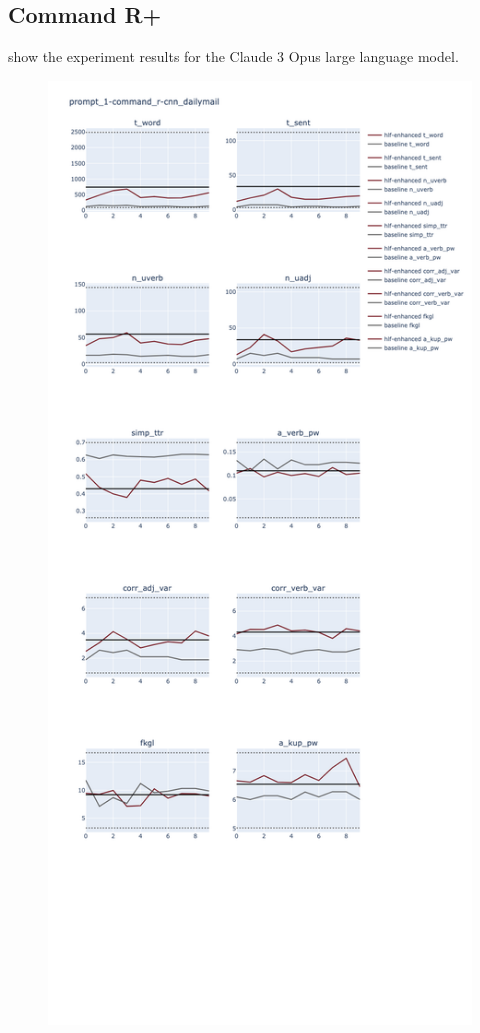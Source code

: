\documentclass[11pt]{article}
\begin{document}
\subsection{Command R+}

show the experiment results for the Claude 3 Opus large language model.

\begin{figure}[ht]
    \includegraphics[width=\textwidth,height=0.9\textheight,scale=1]{plots/prompt_1/prompt_1-command_r-cnn_dailymail/prompt_1-command_r-cnn_dailymail.png}

\end{figure}
\end{document}
